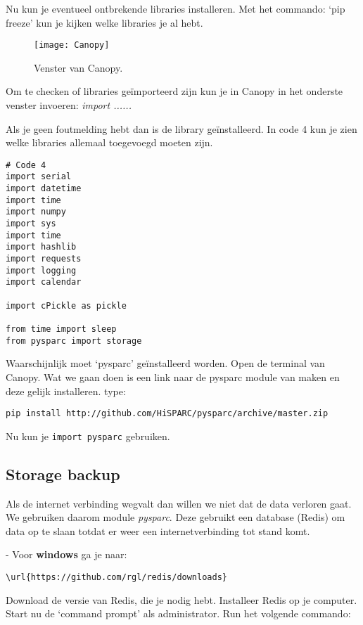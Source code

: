 Nu kun je eventueel ontbrekende libraries installeren. Met het commando: 
`pip freeze' kun je kijken welke libraries je al hebt. 

\begin{figure}
    \centering
    \texttt{[image: Canopy]}
    \caption{Venster van Canopy.}
   \label{fig:Canopy}
\end{figure}

Om te checken of libraries geïmporteerd zijn kun je in Canopy in het onderste venster
invoeren: \emph{import ......}

Als je geen foutmelding hebt dan is de library geïnstalleerd. 
In code 4 kun je zien welke libraries allemaal toegevoegd moeten zijn.
 
\begin{verbatim}
# Code 4
import serial
import datetime
import time
import numpy
import sys
import time
import hashlib
import requests
import logging
import calendar

import cPickle as pickle

from time import sleep
from pysparc import storage

\end{verbatim}

Waarschijnlijk moet `pysparc' geïnstalleerd worden. Open de terminal van
Canopy. Wat we gaan doen is een link naar de pysparc module van \hisparc
maken en deze gelijk installeren. type: 
\begin{verbatim} 
pip install http://github.com/HiSPARC/pysparc/archive/master.zip 
\end{verbatim}

Nu kun je \verb|import pysparc| gebruiken.

\subsection{Storage backup}
Als de internet verbinding wegvalt dan willen we niet dat de data verloren gaat.
We gebruiken daarom module \emph{pysparc}. Deze gebruikt een database (Redis) om data
op te slaan totdat er weer een internetverbinding tot stand komt. 

- Voor \textbf{windows} ga je naar:
\begin{verbatim}
\url{https://github.com/rgl/redis/downloads}
\end{verbatim}

Download de versie van Redis, die je nodig hebt.
Installeer Redis op je computer. Start nu de `command prompt' als administrator.
Run het volgende commando: 

